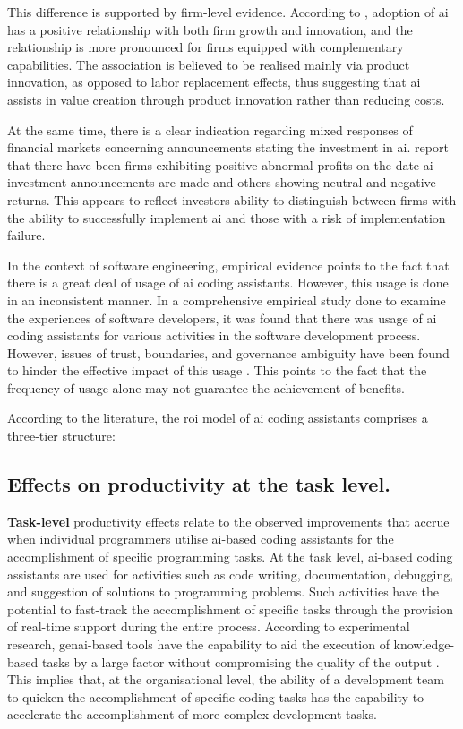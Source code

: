 This difference is supported by firm-level evidence. According to \textcite{Babina2024}, adoption of \gls{ai} has a positive relationship with both firm growth and innovation, and the relationship is more pronounced for firms equipped with complementary capabilities. The association is believed to be realised mainly via product innovation, as opposed to labor replacement effects, thus suggesting that \gls{ai} assists in value creation through product innovation rather than reducing costs.

At the same time, there is a clear indication regarding mixed responses of financial markets concerning announcements stating the investment in \gls{ai}. \textcite{Lui2021} report that there have been firms exhibiting positive abnormal profits on the date \gls{ai} investment announcements are made and others showing neutral and negative returns. This appears to reflect investors ability to distinguish between firms with the ability to successfully implement \gls{ai} and those with a risk of implementation failure.

In the context of software engineering, empirical evidence points to the fact that there is a great deal of usage of \gls{ai} coding assistants. However, this usage is done in an inconsistent manner. In a comprehensive empirical study done to examine the experiences of software developers, it was found that there was usage of \gls{ai} coding assistants for various activities in the software development process. However, issues of trust, boundaries, and governance ambiguity have been found to hinder the effective impact of this usage \autocite{Sergeyuk2025}. This points to the fact that the frequency of usage alone may not guarantee the achievement of benefits.

According to the literature, the \gls{roi} model of \gls{ai} coding assistants comprises a three-tier structure:

\subsection {Effects on productivity at the task level.}
\label{sec:Effects on productivity at the task level}
\textbf{Task-level} productivity effects relate to the observed improvements that accrue when individual programmers utilise \gls{ai}-based coding assistants for the accomplishment of specific programming tasks. At the task level, \gls{ai}-based coding assistants are used for activities such as code writing, documentation, debugging, and suggestion of solutions to programming problems. Such activities have the potential to fast-track the accomplishment of specific tasks through the provision of real-time support during the entire process. According to experimental research, \gls{genai}-based tools have the capability to aid the execution of knowledge-based tasks by a large factor without compromising the quality of the output \autocite{Noy2023}. This implies that, at the organisational level, the ability of a development team to quicken the accomplishment of specific coding tasks has the capability to accelerate the accomplishment of more complex development tasks.

